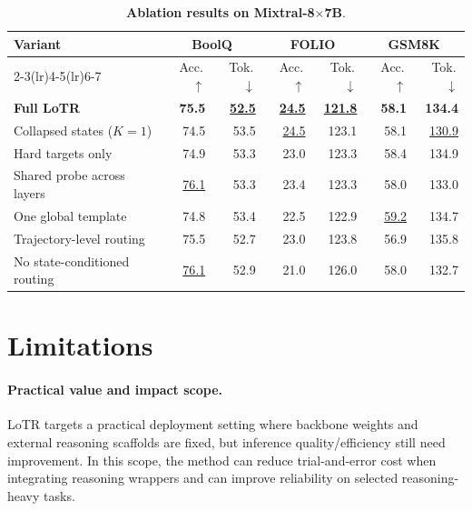 \begin{table}[!t]
\centering
\caption{\textbf{Ablation results on Mixtral-8$\times$7B}.}
\label{tab:app_ablation_mixtral}
\vspace{-2mm}
\small
\setlength{\tabcolsep}{3pt}
\renewcommand{\arraystretch}{1.02}
\begin{tabular}{@{}p{4.74cm}rrrrrr@{}}
\toprule
\multirow{2}{*}[-2pt]{\textbf{Variant}} & \multicolumn{2}{c}{\textbf{BoolQ}} & \multicolumn{2}{c}{\textbf{FOLIO}} & \multicolumn{2}{c}{\textbf{GSM8K}} \\
\cmidrule(lr){2-3}\cmidrule(lr){4-5}\cmidrule(lr){6-7}
& Acc.\,$\uparrow$ & Tok.\,$\downarrow$ & Acc.\,$\uparrow$ & Tok.\,$\downarrow$ & Acc.\,$\uparrow$ & Tok.\,$\downarrow$ \\
\midrule
\cellcolor{cyan!10}\textbf{Full LoTR} & \cellcolor{cyan!10}\textbf{75.5} & \cellcolor{cyan!10}\textbf{\underline{52.5}} & \cellcolor{cyan!10}\textbf{\underline{24.5}} & \cellcolor{cyan!10}\textbf{\underline{121.8}} & \cellcolor{cyan!10}\textbf{58.1} & \cellcolor{cyan!10}\textbf{134.4} \\
Collapsed states ($K{=}1$) & 74.5 & 53.5 & \underline{24.5} & 123.1 & 58.1 & \underline{130.9} \\
Hard targets only & 74.9 & 53.3 & 23.0 & 123.3 & 58.4 & 134.9 \\
Shared probe across layers & \underline{76.1} & 53.3 & 23.4 & 123.3 & 58.0 & 133.0 \\
One global template & 74.8 & 53.4 & 22.5 & 122.9 & \underline{59.2} & 134.7 \\
Trajectory-level routing & 75.5 & 52.7 & 23.0 & 123.8 & 56.9 & 135.8 \\
No state-conditioned routing & \underline{76.1} & 52.9 & 21.0 & 126.0 & 58.0 & 132.7 \\
\bottomrule
\end{tabular}%
\vspace{-1mm}
\end{table}

\clearpage
{}

\section{Limitations}
\label{app:limitations}

\paragraph{Practical value and impact scope.}
LoTR targets a practical deployment setting where backbone weights and external reasoning scaffolds are fixed, but inference quality/efficiency still need improvement. In this scope, the method can reduce trial-and-error cost when integrating reasoning wrappers and can improve reliability on selected reasoning-heavy tasks.

